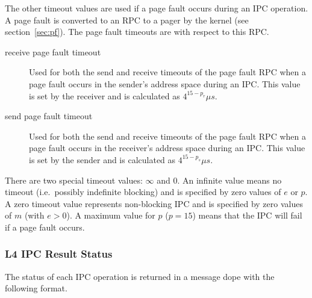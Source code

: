 The other timeout values are used if a page fault occurs during an IPC
operation. A page fault is converted to an RPC to a pager by the
kernel (see section~\ref{sec:pf}). The page fault timeouts are with
respect to this RPC.

\begin{description}

\item[receive page fault timeout] Used for both the send and receive
  timeouts of the page fault RPC when a page fault occurs in the
  sender's address space during an IPC. This value is set by the
  receiver and is calculated as $4^{15-p_r} \mu s$.

\item[send page fault timeout] Used for both the send and receive
  timeouts of the page fault RPC when a page fault occurs in the
  receiver's address space during an IPC. This value is set by the
  sender and is calculated as $4^{15-p_s} \mu s$.

\end{description}

There are two special timeout values: $\infty$ and 0. An infinite
value means no timeout (i.e.\ possibly indefinite blocking) and is
specified by zero values of $e$ or $p$. A zero timeout value
represents non-blocking IPC and is specified by zero values of $m$
(with $e > 0$). A maximum value for $p$ ($p = 15 $) means that the IPC
will fail if a page fault occurs.



\subsubsection{L4 IPC Result Status}


The status of each IPC operation is returned in a message dope with
the following format.\label{s:ccode}

\begin{center}
% 
                          \\
\end{center}

